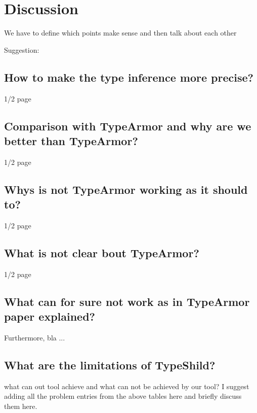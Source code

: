 \chapter{Discussion}
\label{chapter:Discussion}

We have to define which points make sense and then talk about each other

Suggestion: \\

\section{How to make the type inference more precise?}
1/2 page

\section{Comparison with TypeArmor and why are we better than TypeArmor?}
1/2 page

\section{Whys is not TypeArmor working as it should to?}
1/2 page

\section{What is not clear bout TypeArmor?}
1/2 page

\section{What can for sure not work as in TypeArmor paper explained?}

Furthermore, bla ...


\section{What are the limitations of TypeShild? }
\label{What are the limitations of TypeShild ?}

what can out tool achieve and what can not be achieved by our tool?
I suggest adding all the problem entries from the above tables here and briefly discuss them here.
